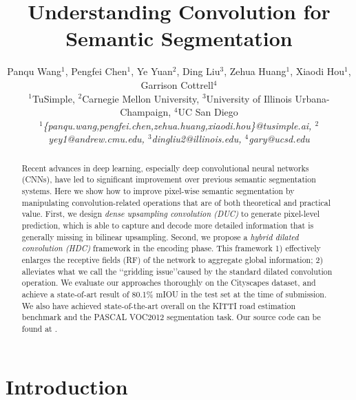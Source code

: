 \documentclass[10pt,twocolumn,letterpaper]{article}
\begin{document}
\title{Understanding Convolution for Semantic Segmentation}

\author[Wang et al.]{Panqu Wang$^1$, Pengfei Chen$^1$, Ye Yuan$^{2}$,
       Ding Liu$^3$, Zehua Huang$^1$, Xiaodi Hou$^1$,
       Garrison Cottrell$^4$\\
       $^1$TuSimple,
       $^2$Carnegie Mellon University,
       $^3$University of Illinois Urbana-Champaign,
       $^4$UC San Diego\\
       \textit{$^1$\{panqu.wang,pengfei.chen,zehua.huang,xiaodi.hou\}@tusimple.ai,
       	       $^2$yey1@andrew.cmu.edu,
               $^3$dingliu2@illinois.edu,
               $^4$gary@ucsd.edu}
       }
\maketitle
\ifwacvfinal\thispagestyle{empty}\fi

\begin{abstract}
Recent advances in deep learning, especially deep convolutional neural networks (CNNs), have led to significant improvement over previous semantic segmentation systems. Here we show how to improve pixel-wise semantic segmentation by manipulating convolution-related operations that are of both theoretical and practical value. First, we design \textit{dense upsampling convolution (DUC)} to generate pixel-level prediction, which is able to capture and decode more detailed information that is generally missing in bilinear upsampling. Second, we propose a \textit{hybrid dilated convolution (HDC)} framework in the encoding phase. This framework 1) effectively enlarges the receptive fields (RF) of the network to aggregate global information; 2) alleviates what we call the \lq\lq gridding issue\rq\rq caused by the standard dilated convolution operation. We evaluate our approaches thoroughly on the Cityscapes dataset, and achieve a state-of-art result of 80.1\% mIOU in the test set at the time of submission. We also have achieved state-of-the-art overall on the KITTI road estimation benchmark and the PASCAL VOC2012 segmentation task. Our source code can be found at \href{https://github.com/TuSimple/TuSimple-DUC}{} .
\end{abstract}

\section{Introduction}
\end{document}
